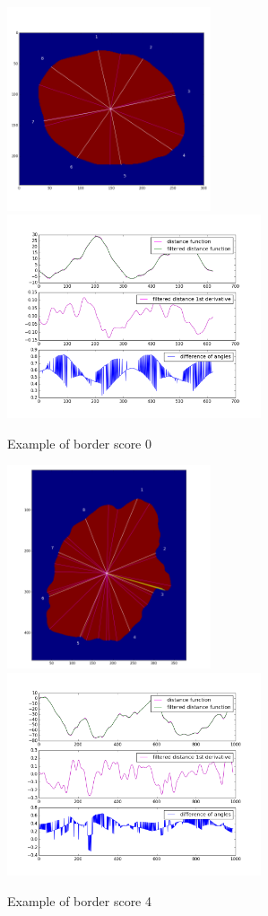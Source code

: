 \begin{figure}[H]
    \includegraphics[height=6cm,keepaspectratio]{assets/border/examples/border_0/border.png}
    \includegraphics[height=6cm,keepaspectratio]{assets/border/examples/border_0/figure_1.png}
    \caption{Example of border score 0}
    \label{fig:border_0}
\end{figure}
\begin{figure}[H]
    \includegraphics[height=6cm,keepaspectratio]{assets/border/examples/border_4/border.png}
    \includegraphics[height=6cm,keepaspectratio]{assets/border/examples/border_4/figure_1.png}
    \caption{Example of border score 4}
    \label{fig:border_4}
\end{figure}
